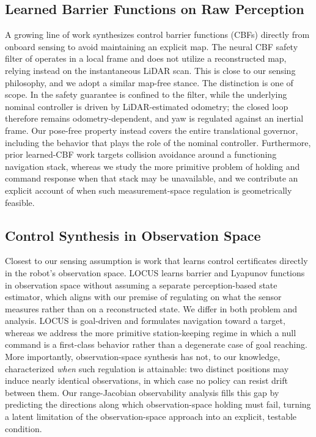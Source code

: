 \documentclass[11pt]{article}
\begin{document}
\subsection{Learned Barrier Functions on Raw Perception}
A growing line of work synthesizes control barrier functions (CBFs) directly
from onboard sensing to avoid maintaining an explicit map. The neural CBF
safety filter of \cite{neuralcbf2024} operates in a local frame and does not
utilize a reconstructed map, relying instead on the instantaneous LiDAR scan.
This is close to our sensing philosophy, and we adopt a similar map-free
stance. The distinction is one of scope. In \cite{neuralcbf2024} the safety
guarantee is confined to the filter, while the underlying nominal controller
is driven by LiDAR-estimated odometry; the closed loop therefore remains
odometry-dependent, and yaw is regulated against an inertial frame. Our
pose-free property instead covers the entire translational governor, including
the behavior that plays the role of the nominal controller. Furthermore,
prior learned-CBF work targets collision avoidance around a functioning
navigation stack, whereas we study the more primitive problem of holding and
command response when that stack may be unavailable, and we contribute an
explicit account of when such measurement-space regulation is geometrically
feasible.

\subsection{Control Synthesis in Observation Space}
Closest to our sensing assumption is work that learns control certificates
directly in the robot's observation space. LOCUS learns barrier and Lyapunov
functions in observation space without assuming a separate perception-based
state estimator\cite{locus2023}, which aligns with our premise of regulating
on what the sensor measures rather than on a reconstructed state. We differ in
both problem and analysis. LOCUS is goal-driven and formulates navigation
toward a target, whereas we address the more primitive station-keeping regime
in which a null command is a first-class behavior rather than a degenerate
case of goal reaching. More importantly, observation-space synthesis has not,
to our knowledge, characterized \emph{when} such regulation is attainable: two
distinct positions may induce nearly identical observations, in which case no
policy can resist drift between them. Our range-Jacobian observability analysis
fills this gap by predicting the directions along which observation-space
holding must fail, turning a latent limitation of the observation-space
approach into an explicit, testable condition.
\end{document}
